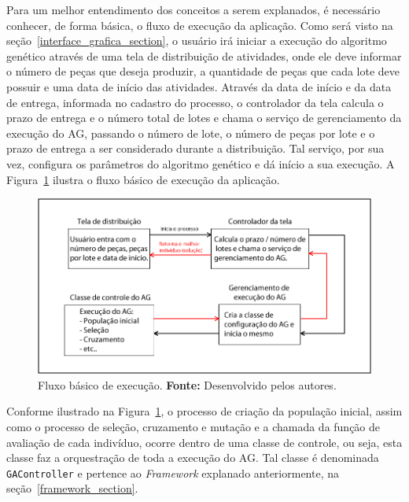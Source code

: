 \par Para um melhor entendimento dos conceitos a serem explanados, é necessário
conhecer, de forma básica, o fluxo de execução da aplicação. Como será visto na seção~\ref{interface_grafica_section}, o usuário irá iniciar a execução do algoritmo genético através de uma tela de distribuição de atividades, onde ele deve informar o número de peças que deseja produzir, a quantidade de peças que cada lote deve possuir e uma data de início das atividades. Através da data de início e da data de entrega, informada no cadastro do processo, o controlador da tela calcula o prazo de entrega e o número total de lotes e chama o serviço de gerenciamento da execução do AG, passando o número de lote, o número de peças por lote e o prazo de entrega a ser considerado durante a distribuição. Tal serviço, por sua vez, configura os parâmetros do algoritmo genético e dá início a sua execução. A Figura~\ref{fig:fluxo_basico} ilustra o fluxo básico de execução da aplicação.

\begin{figure}[h!]
	\centerline{\includegraphics[width=14cm]{./imagens/fluxo_basico.png}}
	\caption[Fluxo básico de execução.]
	{Fluxo básico de execução. \textbf{Fonte:} Desenvolvido pelos autores.}
	\label{fig:fluxo_basico}
\end{figure}

\par Conforme ilustrado na Figura~\ref{fig:fluxo_basico}, o processo de criação da população inicial, assim como o processo de seleção, 
cruzamento e mutação e a chamada da função de avaliação de cada indivíduo, ocorre dentro de uma classe de controle,
ou seja, esta classe faz a orquestração de toda a execução do AG. Tal classe é denominada \texttt{GAController} e
pertence ao \textit{Framework} explanado anteriormente, na seção~\ref{framework_section}.

